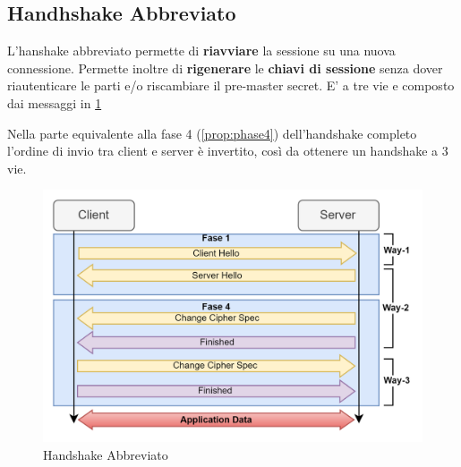 \subsection{Handhshake Abbreviato}
L'hanshake abbreviato permette di \textbf{riavviare} la sessione su una nuova connessione. Permette inoltre di \textbf{rigenerare} le \textbf{chiavi di sessione} senza dover riautenticare le parti e/o riscambiare il pre-master secret. E' a tre vie e composto dai messaggi in \cref{fig:handshakeabbr}
\begin{note}
Nella parte equivalente alla fase 4 (\cref{prop:phase4}) dell'handshake completo l'ordine di invio tra client e server è invertito, così da ottenere un handshake a 3 vie.
\end{note}
\begin{figure}[h]
    \centering
    \includegraphics{image/handshakeabbr.png}
    \caption{Handshake Abbreviato}
    \label{fig:handshakeabbr}
\end{figure}
